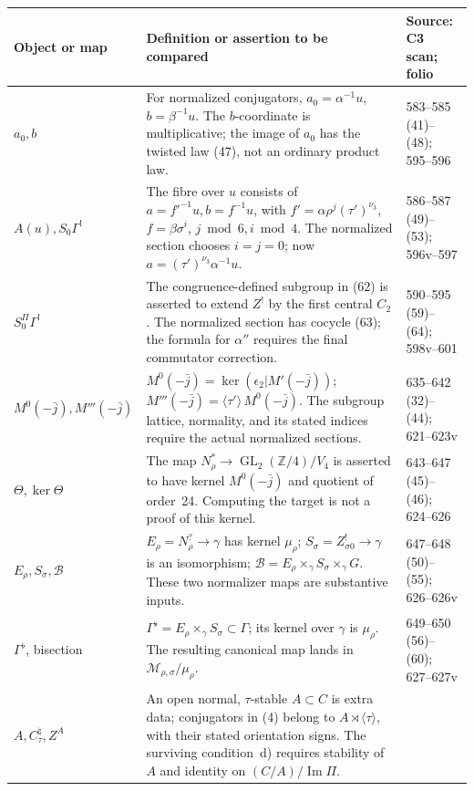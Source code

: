 \begin{longtable}{@{}p{.19\linewidth}p{.57\linewidth}p{.17\linewidth}@{}}
\toprule Object or map&Definition or assertion to be compared&Source: C3 scan; folio\\\midrule\endhead
\(a_0,b\)&For normalized conjugators,
\(a_0=\alpha^{-1}u\), \(b=\beta^{-1}u\).
The \(b\)-coordinate is multiplicative; the image of \(a_0\)
has the twisted law (47), not an ordinary product law.
&583--585 (41)--(48); 595--596\\
\(A(u),S_0\Gamma^!\)&The fibre over \(u\) consists of
\(a=f'^{-1}u,b=f^{-1}u\), with
\(f'=\alpha\rho^j(\tau')^{\nu_3}\),
\(f=\beta\sigma^i\), \(j\bmod6,i\bmod4\).
The normalized section chooses \(i=j=0\); now
\(a=(\tau')^{\nu_3}\alpha^{-1}u\).
&586--587 (49)--(53); 596v--597\\
\(S_0^\Pi\Gamma^!\)&The congruence-defined subgroup in (62)
is asserted to extend \(Z^!\) by the first central \(C_2\).
The normalized section has cocycle (63); the formula for
\(\alpha''\) requires the final commutator correction.
&590--595 (59)--(64); 598v--601\\
\(M^0(-\bar j),M'''(-\bar j)\)&
\(M^0(-\bar j)=\ker(\epsilon_2|M'(-\bar j))\);
\(M'''(-\bar j)=\langle\tau'\rangle\,M^0(-\bar j)\).
The subgroup lattice, normality, and its stated indices
require the actual normalized sections.
&635--642 (32)--(44); 621--623v\\
\(\Theta,\ker\Theta\)&The map
\(N_\rho^*\to\operatorname{GL}_2(\mathbb Z/4)/V_4\)
is asserted to have kernel \(M^0(-\bar j)\) and quotient
of order~24.  Computing the target is not a proof of this kernel.
&643--647 (45)--(46); 624--626\\
\(E_\rho,S_\sigma,\mathcal B\)&
\(E_\rho=N_\rho^?\to\gamma\) has kernel \(\mu_\rho\);
\(S_\sigma=Z_{\sigma0}^!\to\gamma\) is an isomorphism;
\(\mathcal B=E_\rho\times_\gamma S_\sigma\times_\gamma G\).
These two normalizer maps are substantive inputs.
&647--648 (50)--(55); 626--626v\\
\(\Gamma^\flat\), bisection&
\(\Gamma^\flat=E_\rho\times_\gamma S_\sigma\subset\Gamma\);
its kernel over \(\gamma\) is \(\mu_\rho\).
The resulting canonical map lands in
\(\mathcal M_{\rho,\sigma}/\mu_\rho\).
&649--650 (56)--(60); 627--627v\\
\(A,C^\natural_\tau,Z^A\)&An open normal, \(\tau\)-stable
\(A\subset C\) is extra data; conjugators in (4) belong
to \(A\rtimes\langle\tau\rangle\), with their stated
orientation signs.  The surviving condition~d) requires
stability of \(A\) and identity on
\((C/A)/\operatorname{Im}\Pi\).

\end{longtable}
